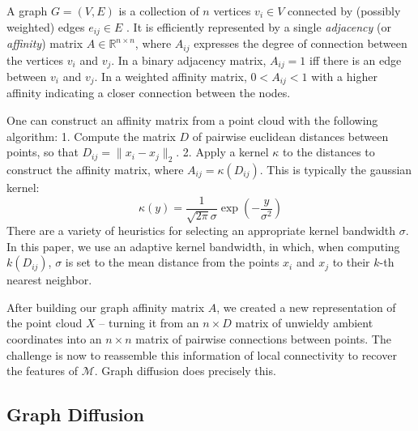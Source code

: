 \documentclass[
  letterpaper,
  DIV=11,
  numbers=noendperiod]{scrartcl}
\theoremstyle{plain}
\theoremstyle{definition}
\theoremstyle{plain}
\theoremstyle{definition}
\theoremstyle{plain}
\theoremstyle{remark}
\begin{document}
A graph \(G = (V, E)\) is a collection of \(n\) vertices \(v_{i} \in V\)
connected by (possibly weighted) edges \(e_{ij} \in E\) . It is
efficiently represented by a single \emph{adjacency} (or
\emph{affinity}) matrix \(A \in \mathbb{R}^{n \times n}\), where
\(A_{ij}\) expresses the degree of connection between the vertices
\(v_{i}\) and \(v_{j}\). In a binary adjacency matrix, \(A_{ij}=1\) iff
there is an edge between \(v_{i}\) and \(v_{j}\). In a weighted affinity
matrix, \(0<A_{ij}<1\) with a higher affinity indicating a closer
connection between the nodes.

One can construct an affinity matrix from a point cloud with the
following algorithm: 1. Compute the matrix \(D\) of pairwise euclidean
distances between points, so that \(D_{ij}=\|x_{i}-x_{j}\|_{2}\). 2.
Apply a kernel \(\kappa\) to the distances to construct the affinity
matrix, where \(A_{ij} = \kappa(D_{ij})\). This is typically the
gaussian kernel: \[
\kappa(y) = \frac{1}{\sqrt{ 2\pi }\sigma}\exp\left( -\frac{y}{\sigma^2} \right)
\] There are a variety of heuristics for selecting an appropriate kernel
bandwidth \(\sigma\). In this paper, we use an adaptive kernel
bandwidth, in which, when computing \(k(D_{ij})\), \(\sigma\) is set to
the mean distance from the points \(x_{i}\) and \(x_{j}\) to their
\(k\)-th nearest neighbor.

After building our graph affinity matrix \(A\), we created a new
representation of the point cloud \(X\) -- turning it from an
\(n \times D\) matrix of unwieldy ambient coordinates into an
\(n \times n\) matrix of pairwise connections between points. The
challenge is now to reassemble this information of local connectivity to
recover the features of \(\mathcal{M}\). Graph diffusion does precisely
this.

\subsection{Graph Diffusion}\label{graph-diffusion}
\end{document}
